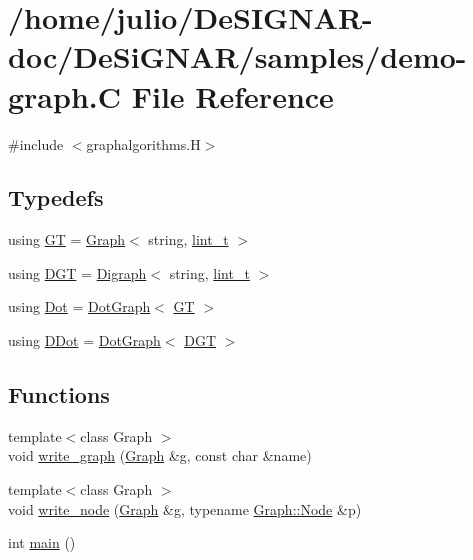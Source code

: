 \hypertarget{demo-graph_8_c}{}\section{/home/julio/\+De\+S\+I\+G\+N\+A\+R-\/doc/\+De\+Si\+G\+N\+A\+R/samples/demo-\/graph.C File Reference}
\label{demo-graph_8_c}
{\ttfamily \#include $<$graphalgorithms.\+H$>$}\newline
\subsection*{Typedefs}
\begin{DoxyCompactItemize}
\item 
using \hyperlink{demo-graph_8_c_aa29146ba261a2a26fce51cbd8557db3b}{GT} = \hyperlink{class_designar_1_1_graph}{Graph}$<$ string, \hyperlink{namespace_designar_a9d113d66a39e82b73727c72cd3a52f73}{lint\+\_\+t} $>$
\item 
using \hyperlink{demo-graph_8_c_a6b9eddfa4274f215240c1c90be9df2dc}{D\+GT} = \hyperlink{class_designar_1_1_digraph}{Digraph}$<$ string, \hyperlink{namespace_designar_a9d113d66a39e82b73727c72cd3a52f73}{lint\+\_\+t} $>$
\item 
using \hyperlink{demo-graph_8_c_a70657b0b48a4d69ef850be3c5517ecc2}{Dot} = \hyperlink{class_designar_1_1_dot_graph}{Dot\+Graph}$<$ \hyperlink{demo-buildgraph_8_c_a3001c40d2c31ca87ed96cd7d1334a55e}{GT} $>$
\item 
using \hyperlink{demo-graph_8_c_a0ffdd103a7285712ccbd9548ff5544e7}{D\+Dot} = \hyperlink{class_designar_1_1_dot_graph}{Dot\+Graph}$<$ \hyperlink{demo-buildgraph_8_c_ae73e956c2a8cf0a58255aa6b659985e0}{D\+GT} $>$
\end{DoxyCompactItemize}
\subsection*{Functions}
\begin{DoxyCompactItemize}
\item 
{\footnotesize template$<$class Graph $>$ }\\void \hyperlink{demo-graph_8_c_a75dee8f1e6289c0fbd2060e643605bfe}{write\+\_\+graph} (\hyperlink{class_designar_1_1_graph}{Graph} \&g, const char \&name)
\item 
{\footnotesize template$<$class Graph $>$ }\\void \hyperlink{demo-graph_8_c_abe260b66e94b606f11fd75beedd0f6dc}{write\+\_\+node} (\hyperlink{class_designar_1_1_graph}{Graph} \&g, typename \hyperlink{class_designar_1_1_graph_a5dfc7dba9d092ac489c72e40390c37d0}{Graph\+::\+Node} \&p)
\item 
int \hyperlink{demo-graph_8_c_ae66f6b31b5ad750f1fe042a706a4e3d4}{main} ()
\end{DoxyCompactItemize}


